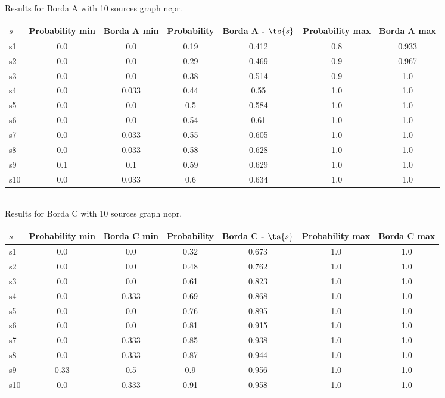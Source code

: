 \documentclass{article}
\begin{document}
\noindent Results for Borda A with 10 sources graph ncpr.

\noindent\begin{tabular}{|l|c|c|c|c|c|c|}
\hline
$s$& Probability min & Borda A min & Probability & Borda A - $\ts{s}$ & Probability max & Borda A max\\
\hline
s1 &0.0 & 0.0 & 0.19 & 0.412 & 0.8 & 0.933\\
\hline
s2 &0.0 & 0.0 & 0.29 & 0.469 & 0.9 & 0.967\\
\hline
s3 &0.0 & 0.0 & 0.38 & 0.514 & 0.9 & 1.0\\
\hline
s4 &0.0 & 0.033 & 0.44 & 0.55 & 1.0 & 1.0\\
\hline
s5 &0.0 & 0.0 & 0.5 & 0.584 & 1.0 & 1.0\\
\hline
s6 &0.0 & 0.0 & 0.54 & 0.61 & 1.0 & 1.0\\
\hline
s7 &0.0 & 0.033 & 0.55 & 0.605 & 1.0 & 1.0\\
\hline
s8 &0.0 & 0.033 & 0.58 & 0.628 & 1.0 & 1.0\\
\hline
s9 &0.1 & 0.1 & 0.59 & 0.629 & 1.0 & 1.0\\
\hline
s10 &0.0 & 0.033 & 0.6 & 0.634 & 1.0 & 1.0\\
\hline
\end{tabular}\\

\noindent Results for Borda C with 10 sources graph ncpr.

\noindent\begin{tabular}{|l|c|c|c|c|c|c|}
\hline
$s$& Probability min & Borda C min & Probability & Borda C - $\ts{s}$ & Probability max & Borda C max\\
\hline
s1 &0.0 & 0.0 & 0.32 & 0.673 & 1.0 & 1.0\\
\hline
s2 &0.0 & 0.0 & 0.48 & 0.762 & 1.0 & 1.0\\
\hline
s3 &0.0 & 0.0 & 0.61 & 0.823 & 1.0 & 1.0\\
\hline
s4 &0.0 & 0.333 & 0.69 & 0.868 & 1.0 & 1.0\\
\hline
s5 &0.0 & 0.0 & 0.76 & 0.895 & 1.0 & 1.0\\
\hline
s6 &0.0 & 0.0 & 0.81 & 0.915 & 1.0 & 1.0\\
\hline
s7 &0.0 & 0.333 & 0.85 & 0.938 & 1.0 & 1.0\\
\hline
s8 &0.0 & 0.333 & 0.87 & 0.944 & 1.0 & 1.0\\
\hline
s9 &0.33 & 0.5 & 0.9 & 0.956 & 1.0 & 1.0\\
\hline
s10 &0.0 & 0.333 & 0.91 & 0.958 & 1.0 & 1.0\\
\hline
\end{tabular}\\
\end{document}
